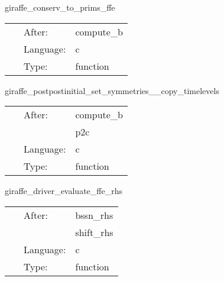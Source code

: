 \vspace{5mm}


\hspace{5mm} giraffe\_conserv\_to\_prims\_ffe 



\hspace{5mm}

 \begin{tabular*}{160mm}{cll} 
~ & After:  & compute\_b \\ 
~ & Language:  & c \\ 
~ & Type:  & function \\ 
\end{tabular*} 


\vspace{5mm}


\hspace{5mm} giraffe\_postpostinitial\_set\_symmetries\_\_copy\_timelevels 

\hspace{5mm}{\it compute post-initialdata quantities } 


\hspace{5mm}

 \begin{tabular*}{160mm}{cll} 
~ & After:  & compute\_b \\ 
~& ~ &p2c\\ 
~ & Language:  & c \\ 
~ & Type:  & function \\ 
\end{tabular*} 


\vspace{5mm}


\hspace{5mm} giraffe\_driver\_evaluate\_ffe\_rhs 

\hspace{5mm}{\it evaluate rhss of grffe equations } 


\hspace{5mm}

 \begin{tabular*}{160mm}{cll} 
~ & After:  & bssn\_rhs \\ 
~& ~ &shift\_rhs\\ 
~ & Language:  & c \\ 
~ & Type:  & function \\ 
\end{tabular*} 


